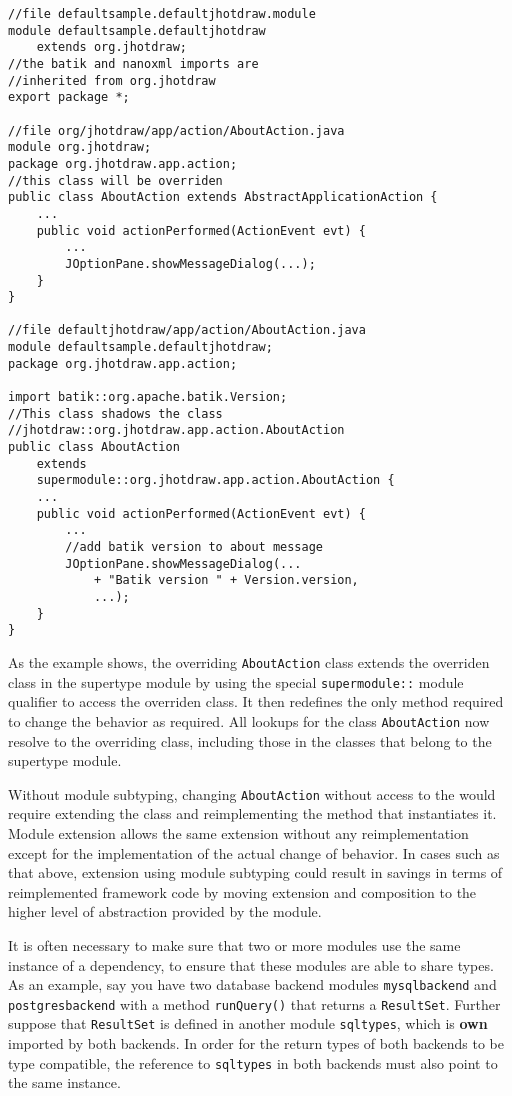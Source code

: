 \begin{lstlisting}[caption=Module Subtyping]
//file defaultsample.defaultjhotdraw.module 
module defaultsample.defaultjhotdraw 
	extends org.jhotdraw;
//the batik and nanoxml imports are 
//inherited from org.jhotdraw
export package *;

//file org/jhotdraw/app/action/AboutAction.java
module org.jhotdraw;
package org.jhotdraw.app.action;
//this class will be overriden
public class AboutAction extends AbstractApplicationAction {
	...
	public void actionPerformed(ActionEvent evt) {
		...
		JOptionPane.showMessageDialog(...);
	}
}

//file defaultjhotdraw/app/action/AboutAction.java
module defaultsample.defaultjhotdraw;
package org.jhotdraw.app.action;

import batik::org.apache.batik.Version;
//This class shadows the class
//jhotdraw::org.jhotdraw.app.action.AboutAction
public class AboutAction 
	extends 
	supermodule::org.jhotdraw.app.action.AboutAction {
	...
	public void actionPerformed(ActionEvent evt) {
		...
		//add batik version to about message
		JOptionPane.showMessageDialog(...
			+ "Batik version " + Version.version,
			...);
	}
}

\end{lstlisting}

As the example shows, the overriding \texttt{AboutAction} class extends the
overriden class in the supertype module by using the special 
\texttt{supermodule::} module qualifier to access the overriden class. It
then redefines the only method required to change the behavior as required.
All lookups for the class \texttt{AboutAction} now resolve to the overriding
class, including those in the classes that belong to the supertype module.

Without module subtyping, changing \texttt{AboutAction} without access to the
would require extending the class and reimplementing the method 
that instantiates it. Module extension allows the same extension without
any reimplementation except for the implementation of the actual change of behavior.
In cases such as that above, extension using module subtyping could result in savings in
terms of reimplemented framework code by moving extension and
composition to the higher level of abstraction provided by the module.


It is often necessary to make sure that two or more modules use the same
instance of a dependency, to ensure that these
modules are able to share types. As an example, say you have two database
backend modules {\tt mysqlbackend} and {\tt postgresbackend} with a method
{\tt runQuery()} that returns a \texttt{ResultSet}. Further suppose that {\tt ResultSet} is
defined in another module {\tt sqltypes}, which is \textbf{own} imported by both backends.
In order for the return types of both backends to be type compatible, the
reference to {\tt sqltypes} in both backends must also point to the same
instance.

